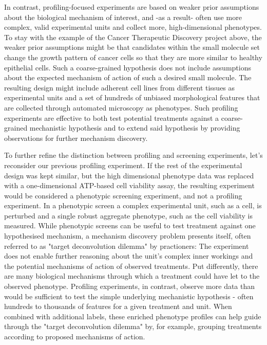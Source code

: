 \begin{flushleft}
In contrast, profiling-focused experiments are based on weaker prior assumptions about the biological mechanism of interest, and -as a result- often use more complex, valid experimental units and collect more, high-dimensional phenotypes. To stay with the example of the Cancer Therapeutic Discovery project above, the weaker prior assumptions might be that candidates within the small molecule set change the growth pattern of cancer cells so that they are more similar to healthy epithelial cells. Such a coarse-grained hypothesis does not include assumptions about the expected mechanism of action of such a desired small molecule. The resulting design might include adherent cell lines from different tissues as experimental units and a set of hundreds of unbiased morphological features that are collected through automated microscopy as phenotypes. Such profiling experiments are effective to both test potential treatments against a coarse-grained mechanistic hypothesis and to extend said hypothesis by providing observations for further mechanism discovery. 

To further refine the distinction between profiling and screening experiments, let's reconsider our previous profiling experiment. If the rest of the experimental design was kept similar, but the high dimensional phenotype data was replaced with a one-dimensional ATP-based cell viability assay, the resulting experiment would be considered a phenotypic screening experiment, and not a profiling experiment. In a phenotypic screen a complex experimental unit, such as a cell, is perturbed and a single robust aggregate phenotype, such as the cell viability is measured. While phenotypic screens can be useful to test treatment against one hypothesised mechanism, a mechanism discovery problem presents itself, often referred to as "target deconvolution dilemma" by practioners: The experiment does not enable further reasoning about the unit's complex inner workings and the potential mechanisms of action of observed treatments. Put differently, there are many biological mechanisms through which a treatment could have let to the observed phenotype. Profiling experiments, in contrast, observe more data than would be sufficient to test the simple underlying mechanistic hypothesis - often hundreds to thousands of features for a given treatment and unit. When combined with additional labels, these enriched phenotype profiles can help guide through the "target deconvolution dilemma" by, for example, grouping treatments according to proposed mechanisms of action.


\end{flushleft}

